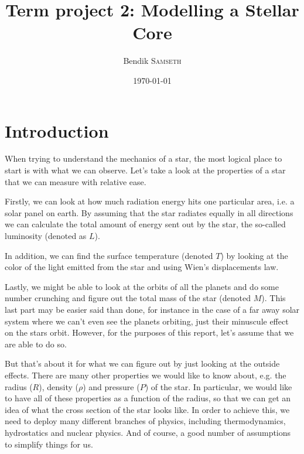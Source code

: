 \documentclass[11pt,twocolumn]{article}
\title{Term project 2: Modelling a Stellar Core}
\author{Bendik \textsc{Samseth}}
\date{\today}
\begin{document}

\section{Introduction}
When trying to understand the mechanics of a star, the most logical
place to start is with what we can observe. Let's take a look at the
properties of a star that we can measure with relative ease. 

Firstly, we can look at how much radiation energy hits one particular
area, i.e. a solar panel on earth. By assuming that the star radiates
equally in all directions we can calculate the total amount of energy
sent out by the star, the so-called luminosity (denoted as $L$).

In addition, we can find the surface temperature (denoted $T$) by
looking at the color of the light emitted from the star and using
Wien's displacements law. 

Lastly, we might be able to look at the orbits of all the planets and
do some number crunching and figure out the total mass of the star
(denoted $M$). This last part may be easier said than done, for
instance in the case of a far away solar system where we can't even
see the planets orbiting, just their minuscule effect on the stars
orbit. However, for the purposes of this report, let's assume that we
are able to do so. 

But that's about it for what we can figure out by just looking at the
outside effects. There are many other properties we would like to know
about, e.g. the radius ($R$), density ($\rho$) and pressure ($P$) of
the star. In particular, we would like to have all of these properties
as a function of the radius, so that we can get an idea of what the
cross section of the star looks like. In order to achieve this, we
need to deploy many different branches of physics, including
thermodynamics, hydrostatics and nuclear physics. And of course, a good
number of assumptions to simplify things for us.
\end{document}
